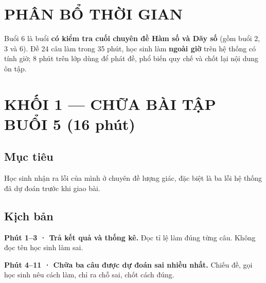 \documentclass[11pt, a4paper]{article}
\begin{document}

\section{PHÂN BỔ THỜI GIAN}


Buổi 6 là buổi \textbf{có kiểm tra cuối chuyên đề Hàm số và Dãy số} (gồm buổi 2, 3 và 6). Đề 24 câu làm trong 35 phút, học sinh làm \textbf{ngoài giờ} trên hệ thống có tính giờ; 8 phút trên lớp dùng để phát đề, phổ biến quy chế và chốt lại nội dung ôn tập.

\section{KHỐI 1 — CHỮA BÀI TẬP BUỔI 5 (16 phút)}

\subsection{Mục tiêu}

Học sinh nhận ra lỗi của mình ở chuyên đề lượng giác, đặc biệt là ba lỗi hệ thống đã dự đoán trước khi giao bài.

\subsection{Kịch bản}

\textbf{Phút 1–3 · Trả kết quả và thống kê.} Đọc tỉ lệ làm đúng từng câu. Không đọc tên học sinh làm sai.

\textbf{Phút 4–11 · Chữa ba câu được dự đoán sai nhiều nhất.} Chiếu đề, gọi học sinh nêu cách làm, chỉ ra chỗ sai, chốt cách đúng.
\end{document}
